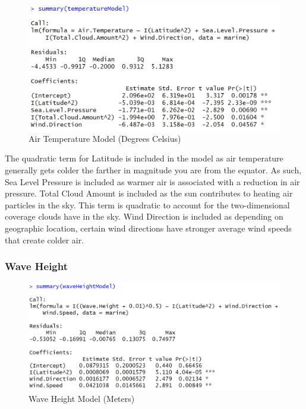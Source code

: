\documentclass{article}
\begin{document}
\begin{figure}[h]
    \centering
    \includegraphics[scale = 0.6]{code snippets/summaryTemperature.PNG}
    \caption{Air Temperature Model (Degrees Celsius)}
    \label{fig:TemperatureModel}
\end{figure}

The quadratic term for Latitude is included in the model as air temperature generally gets colder the farther in magnitude you are from the equator. As such, Sea Level Pressure is included as warmer air is associated with a reduction in air pressure. Total Cloud Amount is included as the sun contributes to heating air particles in the sky. This term is quadratic to account for the two-dimensional coverage clouds have in the sky. Wind Direction is included as depending on geographic location, certain wind directions have stronger average wind speeds that create colder air.

\subsubsection*{Wave Height}

\begin{figure}[h]
    \centering
    \includegraphics[scale = 0.6]{code snippets/summaryWave.PNG}
    \caption{Wave Height Model (Meters)}
    \label{fig:WaveModel}
\end{figure}
\end{document}
